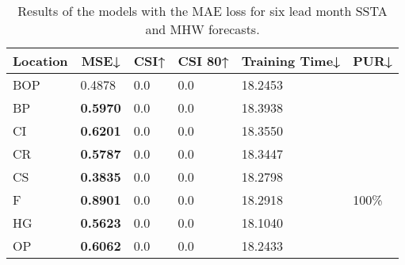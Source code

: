 \documentclass[11pt, a4paper]{article}
\begin{document}
\begin{table}[H]
\centering
\small
\caption{Results of the models with the MAE loss for six lead month SSTA and MHW forecasts.}
\begin{tabular}{llllll}
\multicolumn{1}{c}{\textbf{Location}} & \multicolumn{1}{c}{\textbf{MSE↓}} & \multicolumn{1}{c}{\textbf{CSI↑}} & \multicolumn{1}{c}{\textbf{CSI 80↑}} & \multicolumn{1}{c}{\textbf{Training Time↓}} & \multicolumn{1}{c}{\textbf{PUR↓}} \\ \hline
BOP                         & 0.4878                            & 0.0                               & 0.0                                  & 18.2453                                     &                                   \\
BP                        & \textbf{0.5970}                   & 0.0                               & 0.0                                  & 18.3938                                     &                                   \\
CI                        & \textbf{0.6201}                   & 0.0                               & 0.0                                  & 18.3550                                     &                                   \\
CR                           & \textbf{0.5787}                   & 0.0                               & 0.0                                  & 18.3447                                     &                                   \\
CS                           & \textbf{0.3835}                   & 0.0                               & 0.0                                  & 18.2798                                     &                                   \\
F                             & \textbf{0.8901}                   & 0.0                               & 0.0                                  & 18.2918                                     & 100\%                             \\
HG                          & \textbf{0.5623}                   & 0.0                               & 0.0                                  & 18.1040                                     &                                   \\
OP                       & \textbf{0.6062}                   & 0.0                               & 0.0                                  & 18.2433                                     &                                   \\

\end{tabular}
\end{table}
\end{document}
